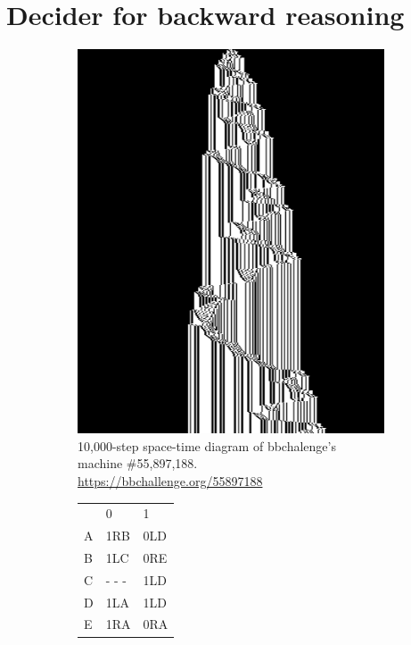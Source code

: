 \section{Decider for backward reasoning}\label{sec:backward-reasoning}

\begin{figure}
  \centering
  \begin{subfigure}[m]{0.45\textwidth}
    \centering
    \includegraphics[width=\textwidth]{space-time-diagrams/backward_reasoning_55897188.png}
    \caption{10,000-step space-time diagram of bbchalenge's machine \#55,897,188. \url{https://bbchallenge.org/55897188}}
    \label{fig:y equals x}
  \end{subfigure}
  \hfill
  \begin{subfigure}[m]{0.45\textwidth}
    \centering
    \begin{tabular}{lll}
                            & 0                       & 1   \\
      \textcolor{colorA}{A} & 1R\textcolor{colorB}{B} & 0LD \\
      \textcolor{colorB}{B} & 1L\textcolor{colorC}{C} & 0RE \\
      \textcolor{colorC}{C} & - - -                   & 1LD \\
      D                     & 1LA                     & 1LD \\
      E                     & 1RA                     & 0RA
    \end{tabular}



\end{subfigure}
\end{figure}
